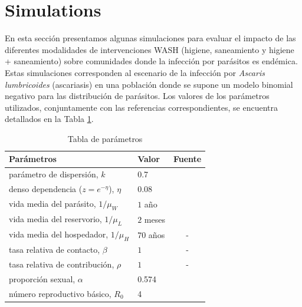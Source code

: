 \documentclass[12pt,a4paper]{article}
\theoremstyle{plain}%
\theoremstyle{definition}
\theoremstyle{remark}
\begin{document}
	\section{Simulations}
	En esta sección presentamos
	algunas simulaciones para evaluar el impacto 
	de las diferentes modalidades de intervenciones WASH (higiene, saneamiento y higiene + saneamiento)
	sobre comunidades donde %
	la infección por parásitos es endémica. 
	Estas simulaciones corresponden al escenario de la infección por \textit{Ascaris lumbricoides} (ascariasis) en una población 
	donde se supone un modelo binomial negativo para las distribución de parásitos.	
	Los valores de los parámetros utilizados, conjuntamente con las referencias correspondientes,  se encuentra detallados
	en la Tabla
	\ref{table:parametros}.
	\begin{table}[h]
		\centering	
		\begin{tabular}{llc} 	
			Parámetros&Valor & Fuente\\
			\hline 
			parámetro de dispersión, $k$ & 0.7 & \cite{elkins1986epidemiology}\cite{hall1999distribution}\\ 
			denso dependencia ($z = e^{-\eta}$), $\eta$ & 0.08 & \cite{holland1989epidemiology}\\ 
			vida media del parásito, $1/\mu_W$ & $1$ año & \cite{croll1982population}\\
			vida media del reservorio, $1/\mu_L$ & $2$ meses & \cite{larsen1999seasonal}\\
			vida media del hospedador, $1/\mu_H$ & $70$ años & - \\
			tasa relativa de contacto, $\beta$ & $1$ & - \\
			tasa relativa de contribución, $\rho$ & $1$ & -\\
			proporción sexual, $\alpha$ & 0.574 & \cite{seo1979egg}\\
			número reproductivo básico, $R_0$ & 4& \cite{croll1982population}
		\end{tabular}
		\caption{Tabla de parámetros}
		\label{table:parametros}
	\end{table}
\end{document}
